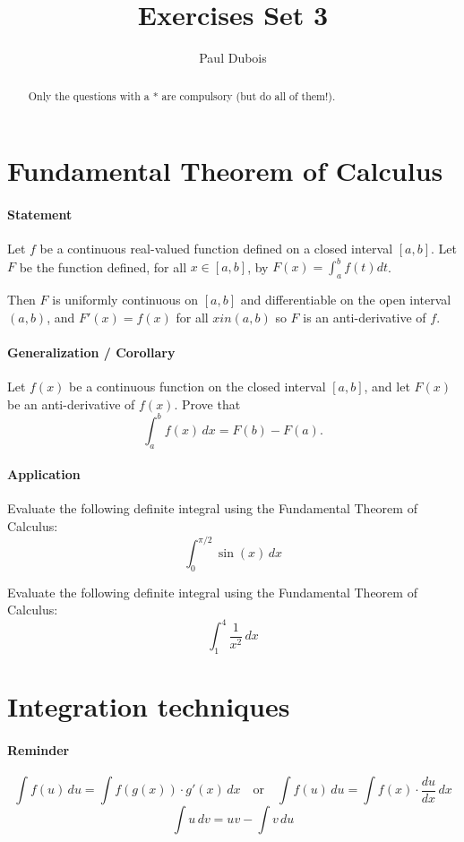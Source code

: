 \documentclass[]{article}
\title{Exercises Set 3}
\author{Paul Dubois}
\begin{document}
	\maketitle
	
	\begin{abstract}
		Only the questions with a * are compulsory (but do all of them!).
	\end{abstract}
	
	\section{Fundamental Theorem of Calculus}
	\paragraph{Statement}
	Let $f$ be a continuous real-valued function defined on a closed interval $\left[ a,b \right]$.
	Let $F$ be the function defined, for all $x \in \left[ a,b \right]$, by $F(x) = \int_a^b f(t) dt$.
	
	Then $F$ is uniformly continuous on $\left[ a,b \right]$ and differentiable on the open interval $\left( a,b \right)$, and $F'(x) = f(x)$ for all $x in \left( a,b \right)$ so $F$ is an anti-derivative of $f$.
	
	\paragraph{Generalization / Corollary}
	Let \( f(x) \) be a continuous function on the closed interval \([a, b]\), and let \( F(x) \) be an anti-derivative of \( f(x) \).
	Prove that
	\[
	\int_a^b f(x) \, dx = F(b) - F(a).
	\]
	
	\paragraph{Application}
	Evaluate the following definite integral using the Fundamental Theorem of Calculus:
	\[
	\int_0^{\pi/2} \sin(x) \, dx
	\]
	
	Evaluate the following definite integral using the Fundamental Theorem of Calculus:
	\[
	\int_1^4 \frac{1}{x^2} \, dx
	\]
	
	
	\section{Integration techniques}
	\paragraph{Reminder}
	$$\int f(u) \, du = \int f(g(x)) \cdot g'(x) \, dx \quad \text {or} \quad \int f(u) \, du = \int f(x) \cdot \frac{du}{dx} \, dx$$
	$$\int u \, dv = uv - \int v \, du$$
	
\end{document}
